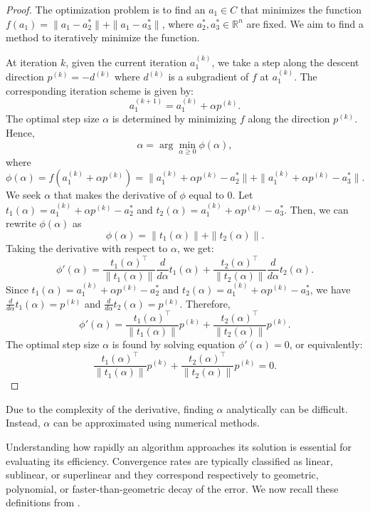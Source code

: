 \documentclass[12pt]{article}
\theoremstyle{plain}
\theoremstyle{definition}
\begin{document}
\begin{proof}
	The optimization problem is to find an $a_1 \in C$ that minimizes the function $f(a_1) = \|a_1 - a_2^*\| + \|a_1 - a_3^*\|$, where $a_2^*, a_3^* \in \mathbb{R}^n$ are fixed. We aim to find a method to iteratively minimize the function.
	
	At iteration $k$, given the current iteration $a_1^{(k)}$, we take a step along the descent direction $p^{(k)}=-d^{(k)}$ where $d^{(k)}$ is a subgradient of $f$ at $a_1^{(k)}$.
	The corresponding iteration scheme is given by:
	$$a_1^{(k+1)} = a_1^{(k)} + \alpha p^{(k)}.	$$	
	The optimal step size $\alpha$ is determined by minimizing $f$ along the direction $p^{(k)}$. Hence,
	$$	\alpha = \arg\min_{\alpha \geq 0} \phi(\alpha),	$$
	where 
	$$
	\phi(\alpha) = f(a_1^{(k)} + \alpha p^{(k)}) = \|a_1^{(k)} + \alpha p^{(k)} - a_2^*\| + \|a_1^{(k)} + \alpha p^{(k)} - a_3^*\|.
	$$
	We seek $\alpha$ that makes the derivative of $\phi$ equal to 0.
	Let $t_1(\alpha) = a_1^{(k)} + \alpha p^{(k)} - a_2^*$ and $t_2(\alpha) = a_1^{(k)} + \alpha p^{(k)} - a_3^*$. Then, we can rewrite $\phi(\alpha)$ as 
	$$
	\phi(\alpha) = \|t_1(\alpha)\| + \|t_2(\alpha)\|.
	$$
	Taking the derivative with respect to $\alpha$, we get:
	$$
	\phi'(\alpha) = \frac{t_1(\alpha)^\top}{\|t_1(\alpha)\|} \frac{d}{d\alpha} t_1(\alpha) + \frac{t_2(\alpha)^\top}{\|t_2(\alpha)\|} \frac{d}{d\alpha} t_2(\alpha).
	$$
	Since $t_1(\alpha) = a_1^{(k)} + \alpha p^{(k)} - a_2^*$ and $t_2(\alpha) = a_1^{(k)} + \alpha p^{(k)} - a_3^*$, we have $\frac{d}{d\alpha} t_1(\alpha) = p^{(k)}$ and $\frac{d}{d\alpha} t_2(\alpha) = p^{(k)}$. Therefore,
	$$
	\phi'(\alpha) = \frac{t_1(\alpha)^\top}{\|t_1(\alpha)\|} p^{(k)} + \frac{t_2(\alpha)^\top}{\|t_2(\alpha)\|} p^{(k)}.
	$$
	The optimal step size $\alpha$ is found by solving equation $\phi'(\alpha) = 0$, or equivalently:
	$$
	\frac{t_1(\alpha)^\top}{\|t_1(\alpha)\|} p^{(k)} + \frac{t_2(\alpha)^\top}{\|t_2(\alpha)\|} p^{(k)} = 0.
	$$	
\end{proof}

Due to the complexity of the derivative, finding $\alpha$ analytically can be difficult. Instead, $\alpha$ can be approximated using numerical methods.

Understanding how rapidly an algorithm approaches its solution is essential for evaluating its efficiency. Convergence rates are typically classified as linear, sublinear, or superlinear and they  correspond respectively to geometric, polynomial, or faster-than-geometric decay of the error. We now recall these definitions from \cite{OR00}.
\end{document}
